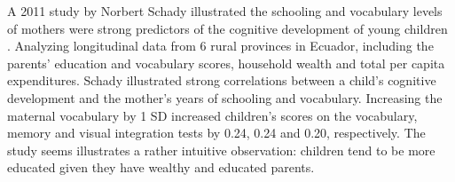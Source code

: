 \documentclass[11pt]{article}
\begin{document}
A 2011 study by Norbert Schady illustrated the schooling and vocabulary levels of mothers were strong predictors of the cognitive development of young children \cite{schady}. Analyzing longitudinal data from 6 rural provinces in Ecuador, including the parents' education and vocabulary scores, household wealth and total per capita expenditures. Schady illustrated strong correlations between a child's cognitive development and the mother's years of schooling and vocabulary. Increasing the maternal vocabulary by 1 SD increased children's scores on the vocabulary, memory and visual integration tests by 0.24, 0.24 and 0.20, respectively. The study seems illustrates a rather intuitive observation: children tend to be more educated given they have wealthy and educated parents.



\end{document}
